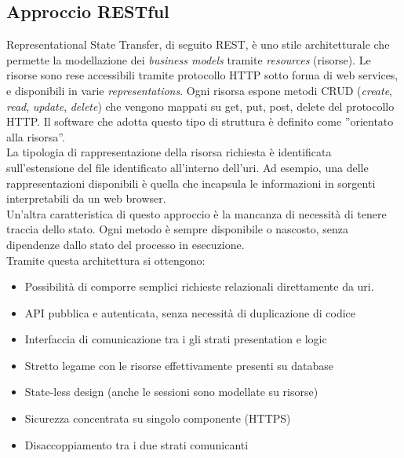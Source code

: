 \subsection{Approccio RESTful}

Representational State Transfer, di seguito REST, è uno stile architetturale che permette la modellazione dei \emph{business models} tramite \emph{resources} (risorse). Le risorse sono rese accessibili tramite protocollo HTTP sotto forma di web services, e disponibili in varie \emph{representations}. Ogni risorsa espone metodi CRUD (\emph{create}, \emph{read}, \emph{update}, \emph{delete}) che vengono mappati su get, put, post, delete del protocollo HTTP. Il software che adotta questo tipo di struttura è definito come ''orientato alla risorsa''.\\

La tipologia di rappresentazione della risorsa richiesta è identificata sull'estensione del file identificato all'interno dell'uri. Ad esempio, una delle rappresentazioni disponibili è quella che incapsula le informazioni in sorgenti interpretabili da un web browser.\\ 

Un'altra caratteristica di questo approccio è la mancanza di necessità di tenere traccia dello stato. Ogni metodo è sempre disponibile o nascosto, senza dipendenze dallo stato del processo in esecuzione.\\ 
Tramite questa architettura si ottengono:

\begin{itemize}
			
\item Possibilità di comporre semplici richieste relazionali direttamente da uri.

\item API pubblica e autenticata, senza necessità di duplicazione di codice

\item Interfaccia di comunicazione tra i gli strati presentation e logic

\item Stretto legame con le risorse effettivamente presenti su database

\item State-less design (anche le sessioni sono modellate su risorse)

\item Sicurezza concentrata su singolo componente (HTTPS)
			
\item Disaccoppiamento tra i due strati comunicanti
\end{itemize}


